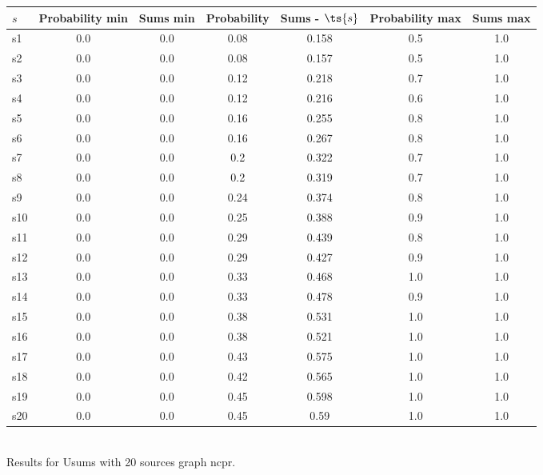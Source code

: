 \documentclass{article}
\begin{document}
\noindent\begin{tabular}{|l|c|c|c|c|c|c|}
\hline
$s$& Probability min & Sums min & Probability & Sums - $\ts{s}$ & Probability max & Sums max\\
\hline
s1 &0.0 & 0.0 & 0.08 & 0.158 & 0.5 & 1.0\\
\hline
s2 &0.0 & 0.0 & 0.08 & 0.157 & 0.5 & 1.0\\
\hline
s3 &0.0 & 0.0 & 0.12 & 0.218 & 0.7 & 1.0\\
\hline
s4 &0.0 & 0.0 & 0.12 & 0.216 & 0.6 & 1.0\\
\hline
s5 &0.0 & 0.0 & 0.16 & 0.255 & 0.8 & 1.0\\
\hline
s6 &0.0 & 0.0 & 0.16 & 0.267 & 0.8 & 1.0\\
\hline
s7 &0.0 & 0.0 & 0.2 & 0.322 & 0.7 & 1.0\\
\hline
s8 &0.0 & 0.0 & 0.2 & 0.319 & 0.7 & 1.0\\
\hline
s9 &0.0 & 0.0 & 0.24 & 0.374 & 0.8 & 1.0\\
\hline
s10 &0.0 & 0.0 & 0.25 & 0.388 & 0.9 & 1.0\\
\hline
s11 &0.0 & 0.0 & 0.29 & 0.439 & 0.8 & 1.0\\
\hline
s12 &0.0 & 0.0 & 0.29 & 0.427 & 0.9 & 1.0\\
\hline
s13 &0.0 & 0.0 & 0.33 & 0.468 & 1.0 & 1.0\\
\hline
s14 &0.0 & 0.0 & 0.33 & 0.478 & 0.9 & 1.0\\
\hline
s15 &0.0 & 0.0 & 0.38 & 0.531 & 1.0 & 1.0\\
\hline
s16 &0.0 & 0.0 & 0.38 & 0.521 & 1.0 & 1.0\\
\hline
s17 &0.0 & 0.0 & 0.43 & 0.575 & 1.0 & 1.0\\
\hline
s18 &0.0 & 0.0 & 0.42 & 0.565 & 1.0 & 1.0\\
\hline
s19 &0.0 & 0.0 & 0.45 & 0.598 & 1.0 & 1.0\\
\hline
s20 &0.0 & 0.0 & 0.45 & 0.59 & 1.0 & 1.0\\
\hline
\end{tabular}\\

\noindent Results for Usums with 20 sources graph ncpr.
\end{document}
